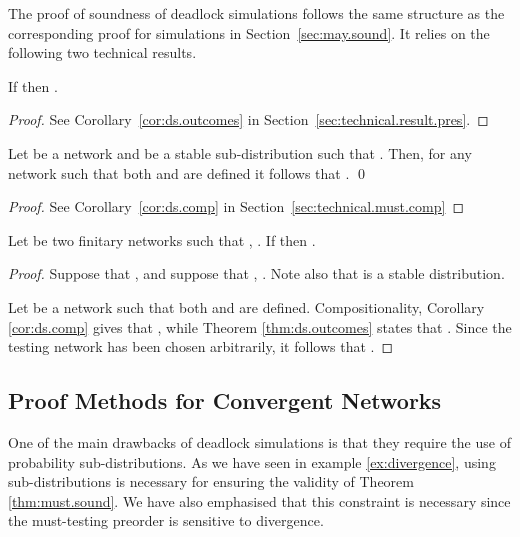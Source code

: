 \documentclass{LMCS}
\begin{document}
The proof of soundness of deadlock simulations follows the same structure as
the corresponding proof for simulations in Section~\ref{sec:may.sound}. It relies on
the following two technical results. 

\begin{thm}
\label{thm:ds.outcomes}
If  then 
. 
\end{thm}
\begin{proof}
  See Corollary~\ref{cor:ds.outcomes} in Section~\ref{sec:technical.result.pres}. 
\end{proof}

\begin{thm}[Compositionality]
\label{thm:ds.comp}
Let  be a network and  be a stable sub-distribution 
such that . Then, for any network  such 
that both  and  are defined 
it follows that .
\qed
\end{thm}

\begin{proof}

See Corollary~\ref{cor:ds.comp} in Section~\ref{sec:technical.must.comp}
\end{proof}



\begin{thm}
\label{thm:must.sound}
Let  be two finitary networks 
such that , . If  
then .
\end{thm}
\begin{proof}
Suppose that , 
and suppose that , 
. Note also that 
 is a stable distribution. 

Let  be a network such that both 
 and  
are defined. 
Compositionality, Corollary \ref{cor:ds.comp} 
gives that , while Theorem \ref{thm:ds.outcomes} 
states that . Since the 
testing network  has been chosen arbitrarily, it 
follows that .
\end{proof}




\subsection{Proof Methods for Convergent Networks}
\label{sec:convergent}

One of the main drawbacks of deadlock simulations 
is that they require the use of probability sub-distributions. 
As we have seen in example \ref{ex:divergence}, 
using sub-distributions is necessary for ensuring 
the validity of Theorem \ref{thm:must.sound}. We 
have also emphasised that this constraint is necessary since 
the must-testing preorder is sensitive to divergence. 
\end{document}
